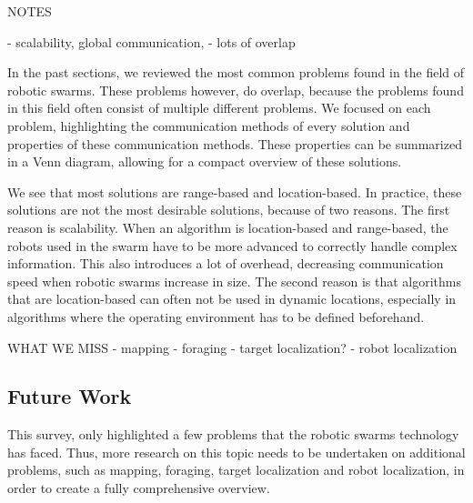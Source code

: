 

NOTES

- scalability, global communication, 
- lots of overlap

In the past sections, we reviewed the most common problems found in the field of robotic swarms. 
These problems however, do overlap, because the problems found in this field often consist of multiple different problems. 
We focused on each problem, highlighting the communication methods of every solution and properties of these communication methods. 
These properties can be summarized in a Venn diagram, allowing for a compact overview of these solutions. 



We see that most solutions are range-based and location-based. 
In practice, these solutions are not the most desirable solutions, because of two reasons. 
The first reason is scalability. 
When an algorithm is location-based and range-based, the robots used in the swarm have to be more advanced to correctly handle complex information. 
This also introduces a lot of overhead, decreasing communication speed when robotic swarms increase in size. 
The second reason is that algorithms that are location-based can often not be used in dynamic locations, especially in algorithms where the operating environment has to be defined beforehand. 

WHAT WE MISS
- mapping
- foraging
- target localization?
- robot localization
\subsection{Future Work}
This survey, only highlighted a few problems that the robotic swarms technology has faced. Thus, more research on this topic needs to be undertaken on additional problems, such as mapping, foraging, target localization and robot localization, in order to create a fully comprehensive overview.

